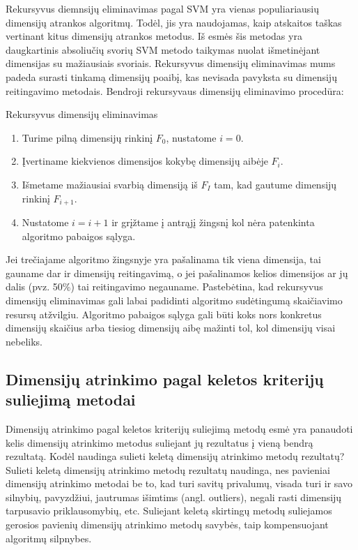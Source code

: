 Rekursyvus diemnsijų eliminavimas pagal SVM yra vienas populiariausių dimensijų
atrankos algoritmų. Todėl, jis yra naudojamas, kaip atskaitos taškas vertinant
kitus dimensijų atrankos metodus. Iš esmės šis metodas yra daugkartinis 
absoliučių svorių SVM metodo taikymas nuolat išmetinėjant dimensijas su 
mažiausiais svoriais. Rekursyvus dimensijų eliminavimas mums padeda surasti 
tinkamą dimensijų poaibį, kas nevisada pavyksta su dimensijų reitingavimo 
metodais. Bendroji rekursyvaus dimensijų eliminavimo procedūra:
\begin{algorithm}
\caption{Rekursyvus dimensijų eliminavimas}
\label{RFE}
 \begin{enumerate}
 \item Turime pilną dimensijų rinkinį $F_0$, nustatome $i=0$.
 \item Įvertiname kiekvienos dimensijos kokybę dimensijų aibėje $F_i$.
 \item Išmetame mažiausiai svarbią dimensiją iš $F_I$ tam, kad gautume
 dimensijų rinkinį $F_{i+1}$.
 \item Nustatome $i=i+1$ ir grįžtame į antrąjį žingsnį kol nėra patenkinta 
 algoritmo pabaigos sąlyga.
\end{enumerate}
\end{algorithm}
Jei trečiajame algoritmo žingsnyje yra pašalinama tik viena dimensija, tai gauname dar
ir dimensijų reitingavimą, o jei pašalinamos kelios dimensijos ar jų dalis
(pvz. 50\%) tai reitingavimo negauname. Pastebėtina, kad rekursyvus dimensijų
eliminavimas gali labai padidinti algoritmo sudėtingumą skaičiavimo resursų
atžvilgiu. Algoritmo pabaigos sąlyga gali būti koks nors konkretus dimensijų
skaičius arba tiesiog dimensijų aibę mažinti tol, kol dimensijų visai nebeliks.


\subsection{Dimensijų atrinkimo pagal keletos kriterijų suliejimą metodai}

Dimensijų atrinkimo pagal keletos kriterijų suliejimą metodų esmė yra panaudoti
kelis dimensijų atrinkimo metodus suliejant jų
rezultatus į vieną bendrą rezultatą. Kodėl naudinga sulieti keletą dimensijų
atrinkimo metodų rezultatų? Sulieti keletą dimensijų atrinkimo metodų rezultatų
naudinga, nes
pavieniai dimensijų atrinkimo metodai be to, kad turi savitų privalumų, visada
turi ir savo silnybių, pavyzdžiui, jautrumas išimtims (angl. outliers), negali
rasti dimensijų tarpusavio priklausomybių, etc. Suliejant keletą skirtingų metodų
suliejamos gerosios pavienių dimensijų atrinkimo metodų savybės, taip
kompensuojant algoritmų silpnybes.

